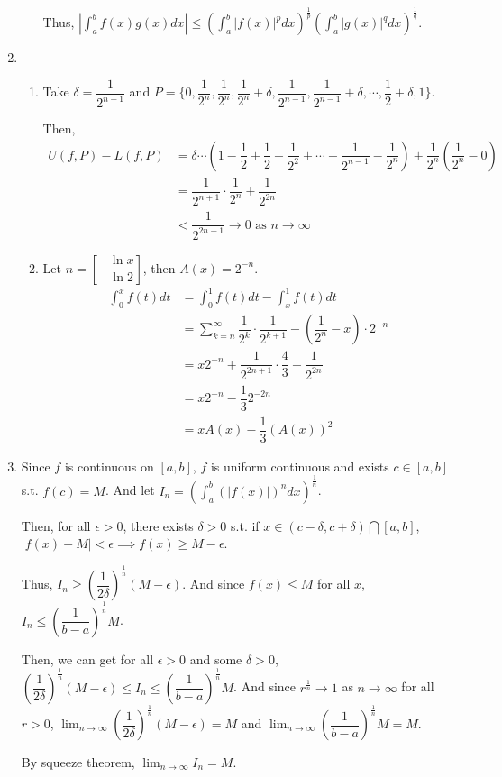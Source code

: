 \documentclass[12pt]{article}
\begin{document}
\begin{enumerate}
\begin{enumerate}
        \newpage
        Thus, $|\displaystyle\int_a^b f(x) g(x) dx| \leq (\displaystyle\int_a^b |f(x)|^p dx)^{\frac{1}{p}} (\displaystyle\int_a^b |g(x)|^q dx)^{\frac{1}{q}}$.
    \end{enumerate}

    \item \begin{enumerate}
        \item Take $\delta = \dfrac{1}{2^{n+1}}$ and $P = \lbrace 0, \dfrac{1}{2^n}, \dfrac{1}{2^n}, \dfrac{1}{2^n} + \delta, \dfrac{1}{2^{n-1}}, \dfrac{1}{2^{n-1}} + \delta, \cdots, \dfrac{1}{2}+\delta, 1\rbrace$.

        Then, \begin{align*}
            U(f, P) - L(f, P) &= \delta \cdots (1 - \dfrac{1}{2} +\dfrac{1}{2} - \dfrac{1}{2^2} + \cdots + \dfrac{1}{2^{n-1}}-\dfrac{1}{2^n}) + \dfrac{1}{2^n}(\dfrac{1}{2^n} - 0)\\
            &= \dfrac{1}{2^{n+1}} \cdot \dfrac{1}{2^n} + \dfrac{1}{2^{2n}}\\
            &< \dfrac{1}{2^{2n-1}} \to 0\text{ as } n\to \infty
        \end{align*}

        \item Let $n = \left[-\dfrac{\ln x}{\ln 2}\right]$, then $A(x) = 2^{-n}$.
        \begin{align*}
            \int_0^x f(t) dt &= \int_0^1 f(t) dt - \int_x^1 f(t) dt\\
            &= \sum_{k=n}^{\infty} \dfrac{1}{2^k} \cdot \dfrac{1}{2^{k+1}} - (\dfrac{1}{2^{n}} - x) \cdot 2^{-n}\\
            &= x2^{-n} + \dfrac{1}{2^{2n+1}}\cdot \dfrac{4}{3} - \dfrac{1}{2^{2n}}\\
            &= x2^{-n} - \dfrac{1}{3}2^{-2n}\\
            &= xA(x) - \dfrac{1}{3}(A(x))^2
        \end{align*}
    \end{enumerate}
    
    \item Since $f$ is continuous on $[a, b]$, $f$ is uniform continuous and exists $c\in [a, b]$ s.t. $f(c) = M$.
    And let $I_n = (\displaystyle\int_a^b (|f(x)|)^n dx)^{\frac{1}{n}}$.
    
    Then, for all $\epsilon > 0$, there exists $\delta > 0$ s.t. if $x \in (c-\delta, c+\delta)\bigcap [a, b]$,
    $|f(x) - M| < \epsilon\implies f(x) \geq M - \epsilon$.

    Thus, $I_n \geq (\dfrac{1}{2\delta})^{\frac{1}{n}}(M-\epsilon)$.
    And since $f(x) \leq M$ for all $x$, $I_n \leq (\dfrac{1}{b-a})^\frac{1}{n} M$.

    Then, we can get for all $\epsilon > 0$ and some $\delta > 0$, $(\dfrac{1}{2\delta})^{\frac{1}{n}}(M-\epsilon) \leq I_n \leq (\dfrac{1}{b-a})^\frac{1}{n} M$.
    And since $r^{\frac{1}{n}} \to 1$ as $n \to \infty$ for all $r > 0$, $\displaystyle\lim_{n\to \infty} (\dfrac{1}{2\delta})^{\frac{1}{n}}(M-\epsilon) =M$ and $\displaystyle\lim_{n\to\infty} (\dfrac{1}{b-a})^\frac{1}{n} M = M$.
    
    By squeeze theorem, $\displaystyle\lim_{n\to\infty} I_n = M$.
\end{enumerate}
\end{document}

